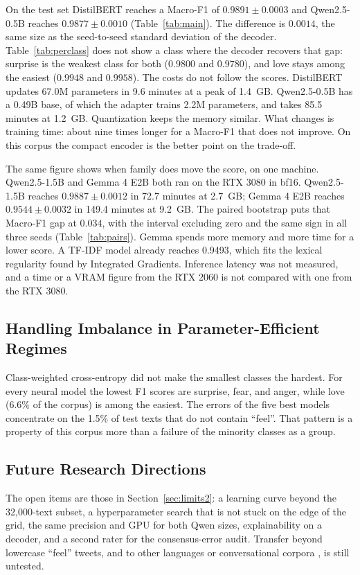 \documentclass[conference]{IEEEtran}
\begin{document}
On the test set DistilBERT reaches a Macro-F1 of $0.9891 \pm 0.0003$ and Qwen2.5-0.5B reaches $0.9877 \pm 0.0010$ (Table~\ref{tab:main}). The difference is $0.0014$, the same size as the seed-to-seed standard deviation of the decoder. Table~\ref{tab:perclass} does not show a class where the decoder recovers that gap: surprise is the weakest class for both ($0.9800$ and $0.9780$), and love stays among the easiest ($0.9948$ and $0.9958$). The costs do not follow the scores. DistilBERT updates 67.0M parameters in 9.6 minutes at a peak of 1.4~GB. Qwen2.5-0.5B has a 0.49B base, of which the adapter trains 2.2M parameters, and takes 85.5 minutes at 1.2~GB. Quantization keeps the memory similar. What changes is training time: about nine times longer for a Macro-F1 that does not improve. On this corpus the compact encoder is the better point on the trade-off.

The same figure shows when family does move the score, on one machine. Qwen2.5-1.5B and Gemma 4 E2B both ran on the RTX 3080 in bf16. Qwen2.5-1.5B reaches $0.9887 \pm 0.0012$ in 72.7 minutes at 2.7~GB; Gemma 4 E2B reaches $0.9544 \pm 0.0032$ in 149.4 minutes at 9.2~GB. The paired bootstrap puts that Macro-F1 gap at $0.034$, with the interval excluding zero and the same sign in all three seeds (Table~\ref{tab:pairs}). Gemma spends more memory and more time for a lower score. A TF-IDF model already reaches 0.9493, which fits the lexical regularity found by Integrated Gradients. Inference latency was not measured, and a time or a VRAM figure from the RTX 2060 is not compared with one from the RTX 3080.

\subsection{Handling Imbalance in Parameter-Efficient Regimes}
Class-weighted cross-entropy did not make the smallest classes the hardest. For every neural model the lowest F1 scores are surprise, fear, and anger, while love (6.6\% of the corpus) is among the easiest. The errors of the five best models concentrate on the 1.5\% of test texts that do not contain ``feel''. That pattern is a property of this corpus more than a failure of the minority classes as a group.

\subsection{Future Research Directions}
The open items are those in Section~\ref{sec:limits2}: a learning curve beyond the 32,000-text subset, a hyperparameter search that is not stuck on the edge of the grid, the same precision and GPU for both Qwen sizes, explainability on a decoder, and a second rater for the consensus-error audit. Transfer beyond lowercase ``feel'' tweets, and to other languages or conversational corpora \cite{alam2026beyond, cheng2026personality}, is still untested.
\end{document}
